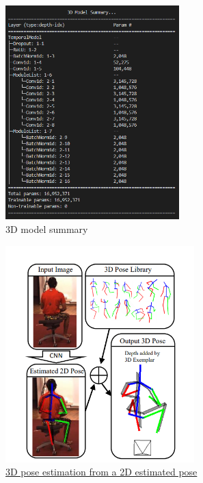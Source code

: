 \begin{figure}[h]
	\centering
	\includegraphics[width=0.6\textwidth]{figures/Implementation/3DModelAr.png}
	\captionsetup{labelformat=empty}
	\caption{3D model summary}
\end{figure}

\pagebreak

\begin{figure}[h]
	\centering
	\includegraphics[width=0.65\textwidth]{figures/Implementation/3DModel2Method.png}
	\captionsetup{labelformat=empty}
	\caption{\href{https://arxiv.org/pdf/1612.06524.pdf}
	{3D pose estimation from a 2D estimated pose}}
\end{figure}

